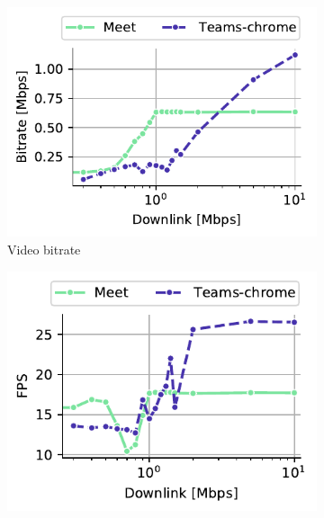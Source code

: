 \begin{figure}[]
    \begin{subfigure}[t]{0.3\textwidth}      
    		\centering
        \includegraphics[width=\textwidth,keepaspectratio]{figures/static/downlink_received_bitrate.pdf}
        \vspace{-2em}
        \caption{Video bitrate}
 		\label{subfig:downlink_video_bitrate}
    \end{subfigure}%
    \hfill
	\begin{subfigure}[t]{0.3\textwidth}   
        \centering
        \includegraphics[width=\textwidth]{figures/static/downlink_received_framesPerSecond.pdf}

\end{subfigure}
\end{figure}

